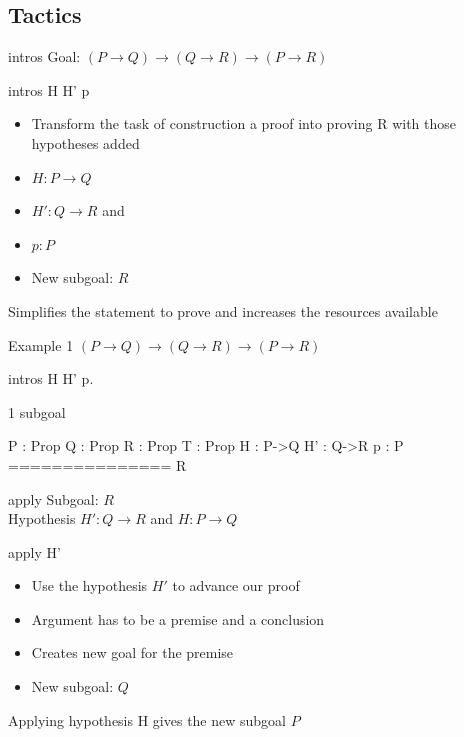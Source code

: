 \subsection{Tactics}
\begin{frame}[fragile]{intros}
	Goal: $(P \rightarrow Q) \rightarrow (Q \rightarrow R) \rightarrow (P \rightarrow R)$ \\
	\medskip
	\pause
	\begin{user}
	intros H H' p
	\end{user}
	\pause
	\begin{itemize}
		\item Transform the task of construction a proof into proving R with those hypotheses added
		\pause
		\item $H:P \rightarrow Q$
		\pause
		\item $H':Q \rightarrow R$ and
		\pause
		\item $p:P$
		\pause
		\item New subgoal: $R$
	\end{itemize}
	\pause
	Simplifies the statement to prove and increases the resources available
\end{frame}
\begin{frame}[fragile]{Example 1}
	$(P \rightarrow Q) \rightarrow (Q \rightarrow R) \rightarrow (P \rightarrow R)$
	\pause
	\begin{user}
		intros H H' p.
	\end{user}
	\pause
	\begin{coq}
		1 subgoal

		P : Prop
		Q : Prop
		R : Prop
		T : Prop
		H : P->Q
		H' : Q->R
		p : P
		===============
		 R
	\end{coq}
\end{frame}
\begin{frame}[fragile]{apply}
	Subgoal: $R$\\
	\medskip
	Hypothesis $H': Q \rightarrow R$ and $H:P \rightarrow Q$
	\medskip
	\pause
	\begin{user}
	apply H'
	\end{user}
	\begin{itemize}
		\item Use the hypothesis $H'$ to advance our proof
		\pause
		\item Argument has to be a premise and a conclusion
		\pause
		\item Creates new goal for the premise
		\pause
		\item New subgoal: $Q$
	\end{itemize}
	\pause
	Applying hypothesis H gives the new subgoal $P$
\end{frame}

